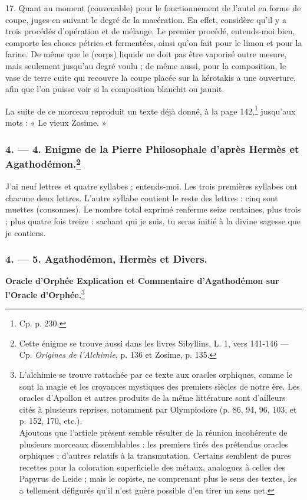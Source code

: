 \documentclass[a4paper, 11pt, oneside, polutonikogreek, french]{article}
\begin{document}
17. Quant au moment (convenable) pour le fonctionnement de l'autel en forme de coupe, juges-en suivant le degré de la macération. En effet, considère qu'il y a trois procédés d'opération et de mélange. Le premier procédé, entends-moi bien, comporte les choses pétries et fermentées, ainsi qu'on fait pour le limon et pour la farine. De même que le (corps) liquide ne doit pas être vaporisé outre mesure, mais seulement jusqu'au degré voulu ; de même aussi, pour la composition, le vase de terre cuite qui recouvre la coupe placée sur la kérotakis a une ouverture, afin que l'on puisse voir si la composition blanchit ou jaunit.

La suite de ce morceau reproduit un texte déjà donné, à la page 142,\footnote{Cp. p. 230.} jusqu'aux mots : « Le vieux Zosime. »

\bigskip
\centerline{\EightStarTaper}
\centerline{\EightStarTaper\EightStarTaper}
\bigskip

\subsubsection[4. --- 4. Enigme de la Pierre Philosophale d'après Hermès et Agathodémon.]{4. --- 4. Enigme de la Pierre Philosophale d'après Hermès et Agathodémon.\footnote{Cette énigme se trouve aussi dans les livres Sibyllins, L. 1, vers 141-146 --- Cp. \emph{Origines de l'Alchimie}, p. 136 et Zosime, p. 135.}}

J'ai neuf lettres et quatre syllabes ; entends-moi. Les trois premières syllabes ont chacune deux lettres. L'autre syllabe contient le reste des lettres : cinq sont muettes (consonnes). Le nombre total exprimé renferme seize centaines, plus trois ; plus quatre fois treize : sachant qui je suis, tu seras initié à la divine sagesse que je contiens.

\bigskip
\centerline{\EightStarTaper}
\centerline{\EightStarTaper\EightStarTaper}
\bigskip

\subsubsection{4. --- 5. Agathodémon, Hermès et Divers.}

\textbf{Oracle d'Orphée Explication et Commentaire d'Agathodémon sur l'Oracle d'Orphée.}\footnote{L'alchimie se trouve rattachée par ce texte aux oracles orphiques, comme le sont la magie et les croyances mystiques des premiers siècles de notre ère. Les oracles d'Apollon et autres produits de la même littérature sont d'ailleurs cités à plusieurs reprises, notamment par Olympiodore (p. 86, 94, 96, 103, et p. 152, 170, etc.).\\\hspace*{5mm}Ajoutons que l'article présent semble résulter de la réunion incohérente de plusieurs morceaux dissemblables : les premiers tirés des prétendus oracles orphiques ; d'autres relatifs à la transmutation. Certains semblent de pures recettes pour la coloration superficielle des métaux, analogues à celles des Papyrus de Leide ; mais le copiste, ne comprenant plus le sens des textes, les a tellement défigurés qu'il n'est guère possible d'en tirer un sens net.}
\end{document}
